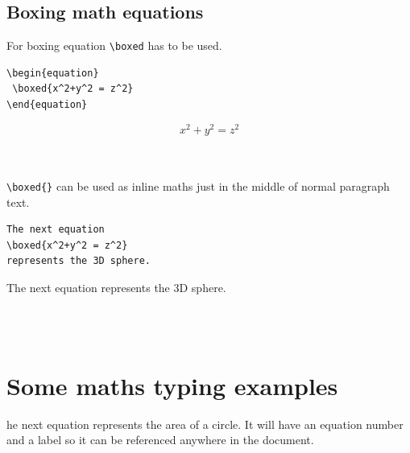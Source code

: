 \documentclass[12pt,a4paper]{article}
\theoremstyle{definition}
\theoremstyle{remark}
\begin{document}



\subsection{Boxing math equations}
For boxing equation \texttt{\textbackslash boxed{}} has to be used.
\bigskip 

\begin{minipage}{0.35\textwidth}
\begin{verbatim}
\begin{equation}
 \boxed{x^2+y^2 = z^2}
\end{equation}
\end{verbatim}
\end{minipage}
\hfill\vline\hfill
\begin{minipage}[c]{0.35\textwidth}
\begin{equation}
 \boxed{x^2+y^2 = z^2}
\end{equation}
\end{minipage}\\ \\

\noindent
\verb|\boxed{}| can be used as inline maths just in the middle of normal paragraph text.\\

\begin{minipage}{0.45\textwidth}
\begin{verbatim}
The next equation 
\boxed{x^2+y^2 = z^2} 
represents the 3D sphere.
\end{verbatim}
\end{minipage}
\hfill\vline\hfill
\begin{minipage}[c]{0.45\textwidth}
The next equation  represents the 3D sphere.
\end{minipage}\\ \\



\section{Some maths typing examples}\label{sec:maths_examples}
he next equation represents the area of a circle. It will have an equation number and a label so it can be referenced anywhere in the document.
\end{document}
